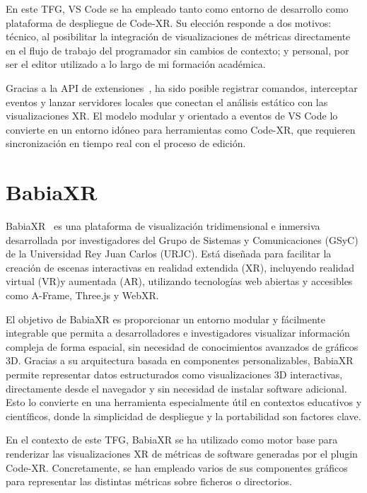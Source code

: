 \documentclass[a4paper, 12pt]{book}
\begin{document}
En este TFG, VS Code se ha empleado tanto como entorno de desarrollo como plataforma de despliegue de Code-XR. Su elección responde a dos motivos: técnico, al posibilitar la integración de visualizaciones de métricas directamente en el flujo de trabajo del programador sin cambios de contexto; y personal, por ser el editor utilizado a lo largo de mi formación académica.  

Gracias a la API de extensiones~\cite{vscode-api}, ha sido posible registrar comandos, interceptar eventos y lanzar servidores locales que conectan el análisis estático con las visualizaciones XR. El modelo modular y orientado a eventos de VS Code lo convierte en un entorno idóneo para herramientas como Code-XR, que requieren sincronización en tiempo real con el proceso de edición.

\section{BabiaXR}
\label{sec:babiaxr}

BabiaXR~\cite{moreno2022babiaxr} es una plataforma de visualización tridimensional e inmersiva desarrollada por investigadores del Grupo de Sistemas y Comunicaciones (GSyC) de la Universidad Rey Juan Carlos (URJC). Está diseñada para facilitar la creación de escenas interactivas en realidad extendida (XR), incluyendo realidad virtual (VR)y aumentada (AR), utilizando tecnologías web abiertas y accesibles como A-Frame, Three.js y WebXR.

El objetivo de BabiaXR es proporcionar un entorno modular y fácilmente integrable que permita a desarrolladores e investigadores visualizar información compleja de forma espacial, sin necesidad de conocimientos avanzados de gráficos 3D. Gracias a su arquitectura basada en componentes personalizables, BabiaXR permite representar datos estructurados como visualizaciones 3D interactivas, directamente desde el navegador y sin necesidad de instalar software adicional. Esto lo convierte en una herramienta especialmente útil en contextos educativos y científicos, donde la simplicidad de despliegue y la portabilidad son factores clave.

En el contexto de este TFG, BabiaXR se ha utilizado como motor base para renderizar las visualizaciones XR de métricas de software generadas por el plugin Code-XR. Concretamente, se han empleado varios de sus componentes gráficos para representar las distintas métricas sobre ficheros o directorios.

\end{document}
